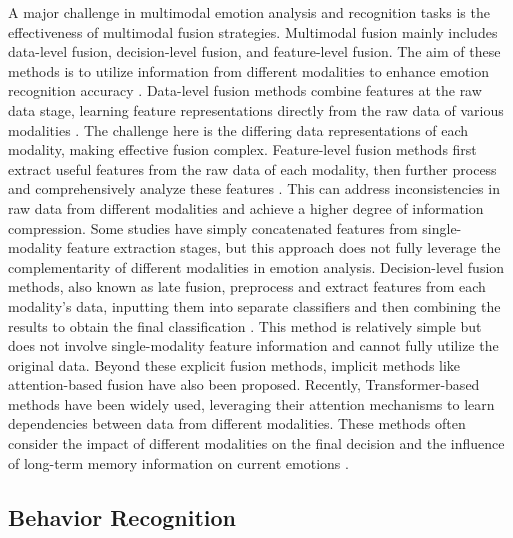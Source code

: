 \documentclass[preprint,12pt]{elsarticle}
\begin{document}
A major challenge in multimodal emotion analysis and recognition tasks is the effectiveness of multimodal fusion strategies. Multimodal fusion mainly includes data-level fusion, decision-level fusion, and feature-level fusion. The aim of these methods is to utilize information from different modalities to enhance emotion recognition accuracy \cite{ref19}. Data-level fusion methods combine features at the raw data stage, learning feature representations directly from the raw data of various modalities \cite{ref20}. The challenge here is the differing data representations of each modality, making effective fusion complex. Feature-level fusion methods first extract useful features from the raw data of each modality, then further process and comprehensively analyze these features \cite{ref21, ref22}. This can address inconsistencies in raw data from different modalities and achieve a higher degree of information compression. Some studies have simply concatenated features from single-modality feature extraction stages, but this approach does not fully leverage the complementarity of different modalities in emotion analysis. Decision-level fusion methods, also known as late fusion, preprocess and extract features from each modality's data, inputting them into separate classifiers and then combining the results to obtain the final classification \cite{ref23}. This method is relatively simple but does not involve single-modality feature information and cannot fully utilize the original data. Beyond these explicit fusion methods, implicit methods like attention-based fusion have also been proposed. Recently, Transformer-based methods have been widely used, leveraging their attention mechanisms to learn dependencies between data from different modalities. These methods often consider the impact of different modalities on the final decision and the influence of long-term memory information on current emotions \cite{ref24,ref25}.

\subsection{Behavior Recognition}
\end{document}
